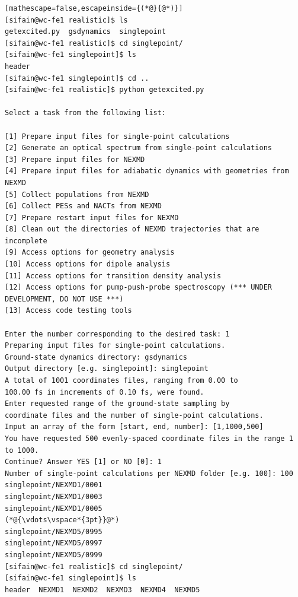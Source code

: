 \documentclass[letterpaper,12pt,titlepage]{article}
\begin{document}
\begin{lstlisting}[mathescape=false,escapeinside={(*@}{@*)}]
[sifain@wc-fe1 realistic]$ ls
getexcited.py  gsdynamics  singlepoint
[sifain@wc-fe1 realistic]$ cd singlepoint/
[sifain@wc-fe1 singlepoint]$ ls
header
[sifain@wc-fe1 singlepoint]$ cd ..
[sifain@wc-fe1 realistic]$ python getexcited.py 

Select a task from the following list:

[1] Prepare input files for single-point calculations
[2] Generate an optical spectrum from single-point calculations
[3] Prepare input files for NEXMD
[4] Prepare input files for adiabatic dynamics with geometries from NEXMD
[5] Collect populations from NEXMD
[6] Collect PESs and NACTs from NEXMD
[7] Prepare restart input files for NEXMD
[8] Clean out the directories of NEXMD trajectories that are incomplete
[9] Access options for geometry analysis
[10] Access options for dipole analysis
[11] Access options for transition density analysis
[12] Access options for pump-push-probe spectroscopy (*** UNDER DEVELOPMENT, DO NOT USE ***)
[13] Access code testing tools

Enter the number corresponding to the desired task: 1
Preparing input files for single-point calculations.
Ground-state dynamics directory: gsdynamics
Output directory [e.g. singlepoint]: singlepoint
A total of 1001 coordinates files, ranging from 0.00 to 
100.00 fs in increments of 0.10 fs, were found.
Enter requested range of the ground-state sampling by 
coordinate files and the number of single-point calculations.
Input an array of the form [start, end, number]: [1,1000,500]
You have requested 500 evenly-spaced coordinate files in the range 1 to 1000.
Continue? Answer YES [1] or NO [0]: 1
Number of single-point calculations per NEXMD folder [e.g. 100]: 100
singlepoint/NEXMD1/0001
singlepoint/NEXMD1/0003
singlepoint/NEXMD1/0005
(*@{\vdots\vspace*{3pt}}@*)
singlepoint/NEXMD5/0995
singlepoint/NEXMD5/0997
singlepoint/NEXMD5/0999
[sifain@wc-fe1 realistic]$ cd singlepoint/
[sifain@wc-fe1 singlepoint]$ ls
header  NEXMD1  NEXMD2  NEXMD3  NEXMD4  NEXMD5
\end{lstlisting}
\end{document}
